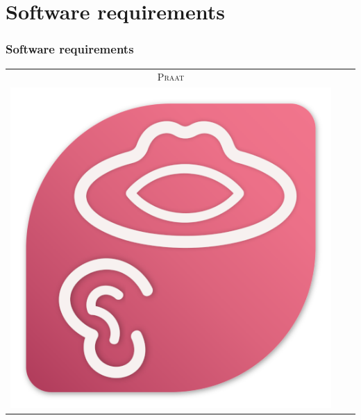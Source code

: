 \documentclass[12pt,a4paper]{beamer}
\begin{document}
\section{Software requirements}
\begin{frame}
    \frametitle{Software requirements}
    \centering
    \begin{tabular}{ccc}
        \textsc{Praat} & \hspace{5cm} & \\
        \includegraphics[scale=0.75]{../pictures/Praat_logo.png}
    \end{tabular}
\end{frame}
\end{document}
